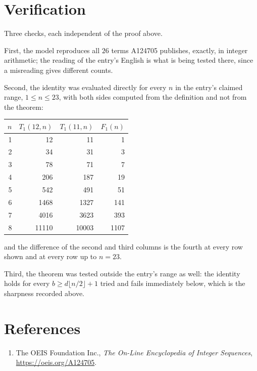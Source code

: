 \documentclass[11pt,a4paper]{article}
\theoremstyle{plain}
\theoremstyle{definition}
\begin{document}
\section{Verification}

Three checks, each independent of the proof above.

First, the model reproduces all $26$ terms A124705 publishes, exactly, in integer
arithmetic; the reading of the entry's English is what is being tested there, since a
misreading gives different counts.

Second, the identity was evaluated directly for every $n$ in the entry's claimed range,
$1\le n\le23$, with both sides computed from the definition and not from the theorem:

\begin{center}
\begin{tabular}{rrrr}
$n$ & $T_{1}(12,n)$ & $T_{1}(11,n)$ & $F_{1}(n)$ \\ \hline
1 & 12 & 11 & 1 \\
2 & 34 & 31 & 3 \\
3 & 78 & 71 & 7 \\
4 & 206 & 187 & 19 \\
5 & 542 & 491 & 51 \\
6 & 1468 & 1327 & 141 \\
7 & 4016 & 3623 & 393 \\
8 & 11110 & 10003 & 1107 \\
\end{tabular}
\end{center}

\noindent and the difference of the second and third columns is the fourth at every row shown
and at every row up to $n=23$.

Third, the theorem was tested outside the entry's range as well: the identity holds for every
$b\ge d\lfloor n/2\rfloor+1$ tried and fails immediately below, which is the sharpness recorded
above.

\section*{References}
\begin{enumerate}
\item The OEIS Foundation Inc., \emph{The On-Line Encyclopedia of Integer Sequences},
\url{https://oeis.org/A124705}.
\end{enumerate}
\end{document}
